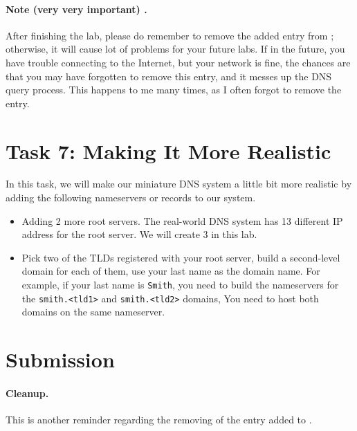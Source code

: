 \paragraph{ Note (very very important) .} 
After finishing the lab, please do remember to remove the added entry
from ; otherwise, it will 
cause lot of problems for your future labs. If in the future,
you have trouble connecting to the Internet, but your network is fine, 
the chances are that you may have forgotten to remove this entry, and it 
messes up the DNS query process. This happens to me many times,
as I often forgot to remove the entry.


\section{Task 7: Making It More Realistic}


In this task, we will make our miniature DNS system
a little bit more realistic by adding the following 
nameservers or records to our system. 


\begin{itemize}
\item Adding 2 more root servers. The real-world DNS system has 13 different 
IP address for the root server. We will create 3 in this lab.


\item Pick two of the TLDs registered with your root server, 
build a second-level domain for each of them, use your last name as the domain name. 
For example, if your last name is \texttt{Smith}, you need to build the 
nameservers for the \texttt{smith.<tld1>} and \texttt{smith.<tld2>} domains,
You need to host both domains on the same nameserver. 
\end{itemize}





 


\section{Submission}



\paragraph{Cleanup.} This is another reminder regarding the 
removing of the entry added to . 



